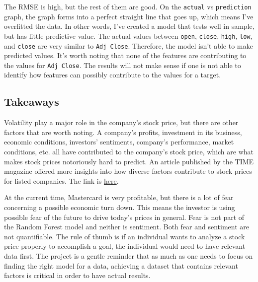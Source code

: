 \documentclass[11pt]{article}
\begin{document}
    The RMSE is high, but the rest of them are good. On the \texttt{actual}
vs \texttt{prediction} graph, the graph forms into a perfect straight
line that goes up, which means I've overfitted the data. In other words,
I've created a model that tests well in sample, but has little
predictive value. The actual values between \texttt{open},
\texttt{close}, \texttt{high}, \texttt{low}, and \texttt{close} are very
similar to \texttt{Adj\ Close}. Therefore, the model isn't able to make
predicted values. It's worth noting that none of the features are
contributing to the values for \texttt{Adj\ Close}. The results will not
make sense if one is not able to identify how features can possibly
contribute to the values for a target.

    \hypertarget{takeaways}{%
\subsection{Takeaways}\label{takeaways}}

Volatility play a major role in the company's stock price, but there are
other factors that are worth noting. A company's profits, investment in
its business, economic conditions, investors' sentiments, company's
performance, market conditions, etc. all have contributed to the
company's stock price, which are what makes stock prices notoriously
hard to predict. An article published by the TIME magazine offered more
insights into how diverse factors contribute to stock prices for listed
companies. The link is
\href{https://time.com/personal-finance/article/how-are-stock-prices-determined/}{here}.

At the current time, Mastercard is very profitable, but there is a lot
of fear concerning a possible economic turn down. This means the
investor is using possible fear of the future to drive today's prices in
general. Fear is not part of the Random Forest model and neither is
sentiment. Both fear and sentiment are not quantifiable. The rule of
thumb is if an individual wants to analyze a stock price properly to
accomplish a goal, the individual would need to have relevant data
first. The project is a gentle reminder that as much as one needs to
focus on finding the right model for a data, achieving a dataset that
contains relevant factors is critical in order to have actual results.


    
    
    
\end{document}
